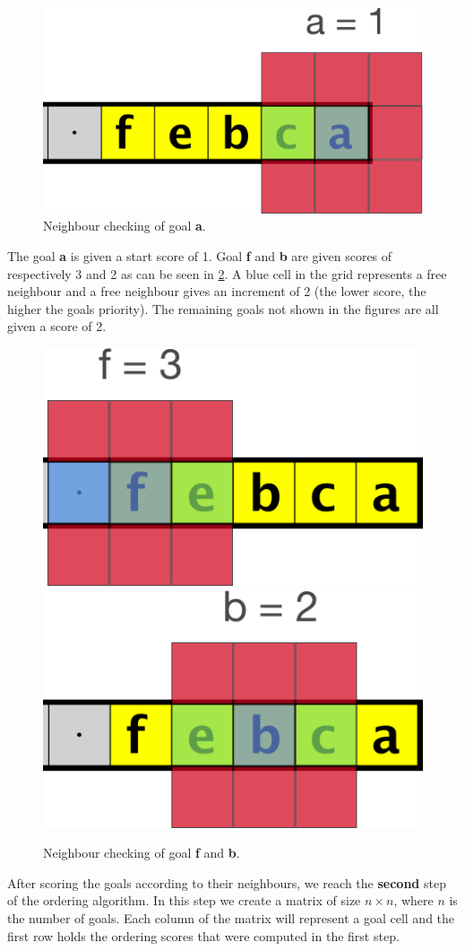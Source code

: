 \begin{figure}[ht!]
  \centering
  \includegraphics[width=.5\columnwidth]{graphics/goal_pri_1.png}
  \caption{\label{fig:grid1}Neighbour checking of goal \textbf{a}.}
\end{figure}

The goal \textbf{a} is given a start score of 1. 
Goal \textbf{f} and \textbf{b} are given scores of respectively 3 and 2 as can be seen in \cref{fig:grid2}. 
A blue cell in the grid represents a free neighbour and a free neighbour gives an increment of 2 (the lower score, the higher the goals priority).
The remaining goals not shown in the figures are all given a score of 2. 

\begin{figure}[h!]
  \centering
  \includegraphics[width=.5\columnwidth]{graphics/goal_pri_3.png}
  \includegraphics[width=.5\columnwidth]{graphics/goal_pri_2.png}
  \caption{\label{fig:grid2}Neighbour checking of goal \textbf{f} and \textbf{b}.}
\end{figure}

After scoring the goals according to their neighbours, we reach the \textbf{second} step of the ordering algorithm. 
In this step we create a matrix of size $n \times n$, where $n$ is the number of goals. 
Each column of the matrix will represent a goal cell and the first row holds the ordering scores that were computed in the first step. 

